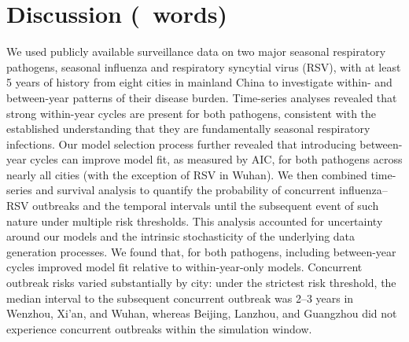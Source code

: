 \section{Discussion (\discussionwordcount~words)}


We used publicly available surveillance data on two major seasonal respiratory pathogens, seasonal influenza and respiratory syncytial virus (RSV), with at least 5 years of history from eight cities in mainland China to investigate within- and between-year patterns of their disease burden.
Time-series analyses revealed that strong within-year cycles are present for both pathogens, consistent with the established understanding that they are fundamentally seasonal respiratory infections.
Our model selection process further revealed that introducing between-year cycles can improve model fit, as measured by AIC, for both pathogens across nearly all cities (with the exception of RSV in Wuhan).
We then combined time-series and survival analysis to quantify the probability of concurrent influenza–RSV outbreaks and the temporal intervals until the subsequent event of such nature under multiple risk thresholds.
This analysis accounted for uncertainty around our models and the intrinsic stochasticity of the underlying data generation processes.
We found that, for both pathogens, including between-year cycles improved model fit relative to within-year-only models.
Concurrent outbreak risks varied substantially by city: under the strictest risk threshold, the median interval to the subsequent concurrent outbreak was 2--3 years in Wenzhou, Xi'an, and Wuhan, whereas Beijing, Lanzhou, and Guangzhou did not experience concurrent outbreaks within the simulation window.


